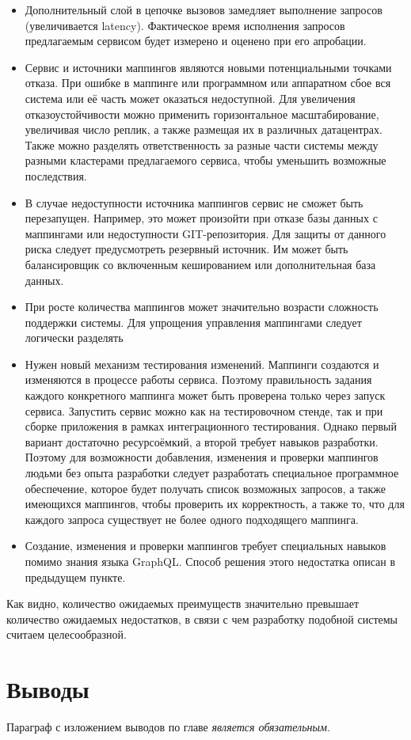 \begin{itemize}
	\item Дополнительный слой в цепочке вызовов замедляет выполнение запросов (увеличивается latency).
	Фактическое время исполнения запросов предлагаемым сервисом будет измерено и оценено при его апробации.

	\item Сервис и источники маппингов являются новыми потенциальными точками отказа.
	При ошибке в маппинге или программном или аппаратном сбое вся система или её часть может оказаться недоступной.
	Для увеличения отказоустойчивости можно применить горизонтальное масштабирование, увеличивая число реплик, а также размещая их в различных датацентрах.
	Также можно разделять ответственность за разные части системы между разными кластерами предлагаемого сервиса, чтобы уменьшить возможные последствия.

	\item В случае недоступности источника маппингов сервис не сможет быть перезапущен.
	Например, это может произойти при отказе базы данных с маппингами или недоступности GIT-репозитория.
	Для защиты от данного риска следует предусмотреть резервный источник.
	Им может быть балансировщик со включенным кешированием или дополнительная база данных.

	\item При росте количества маппингов может значительно возрасти сложность поддержки системы.
	Для упрощения управления маппингами следует логически разделять

	\item Нужен новый механизм тестирования изменений.
	Маппинги создаются и изменяются в процессе работы сервиса.
	Поэтому правильность задания каждого конкретного маппинга может быть проверена только через запуск сервиса.
	Запустить сервис можно как на тестировочном стенде, так и при сборке приложения в рамках интеграционного тестирования.
	Однако первый вариант достаточно ресурсоёмкий, а второй требует навыков разработки.
	Поэтому для возможности добавления, изменения и проверки маппингов людьми без опыта разработки следует разработать специальное программное обеспечение, которое будет получать список возможных запросов, а также имеющихся маппингов, чтобы проверить их корректность, а также то, что для каждого запроса существует не более одного подходящего маппинга.

	\item Создание, изменения и проверки маппингов требует специальных навыков помимо знания языка GraphQL\@.
	Способ решения этого недостатка описан в предыдущем пункте.

\end{itemize}

Как видно, количество ожидаемых преимуществ значительно превышает количество ожидаемых недостатков, в связи с чем разработку подобной системы считаем целесообразной.

\section{Выводы} \label{sec:conclusion}

Параграф с изложением выводов по главе \textit{является обязательным}.